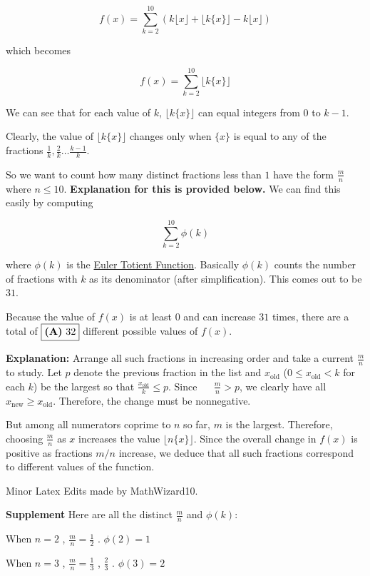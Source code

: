 \begin{enumerate}
 
 \[f(x) = \sum_{k=2}^{10} ( k \lfloor x \rfloor + \lfloor k \{ x \} \rfloor - k \lfloor x \rfloor)\]

 which becomes

 
 \[f(x) = \sum_{k=2}^{10} \lfloor k \{ x \} \rfloor\]

 We can see that for each value of $k$, $\lfloor k \{ x \} \rfloor$ can equal integers from $0$ to $k-1$. 

 Clearly, the value of $\lfloor k \{ x \} \rfloor$ changes only when $\{ x \}$ is equal to any of the fractions $\frac{1}{k}, \frac{2}{k} \dots \frac{k-1}{k}$.

 So we want to count how many distinct fractions less than $1$ have the form $\frac{m}{n}$ where $n \le 10$. \textbf{Explanation for this is provided below.} We can find this easily by computing

 
 \[\sum_{k=2}^{10} \phi(k)\]

 where $\phi(k)$ is the \href{https://artofproblemsolving.com/wiki/index.php?title=Euler\_Totient\_Function}{Euler Totient Function}. Basically $\phi(k)$ counts the number of fractions with $k$ as its denominator (after simplification). This comes out to be $31$.

 Because the value of $f(x)$ is at least $0$ and can increase $31$ times, there are a total of $\fbox{\textbf{(A)}\ 32}$ different possible values of $f(x)$.

 \textbf{Explanation:} Arrange all such fractions in increasing order and take a current $\frac{m}{n}$ to study. Let $p$ denote the previous fraction in the list and $x_\text{old}$ ($0 \le x_\text{old} < k$ for each $k$) be the largest so that $\frac{x_\text{old}}{k} \le p$. Since  $\text{ }\text{ }\frac{m}{n} > p$, we clearly have all $x_\text{new} \ge x_\text{old}$. Therefore, the change must be nonnegative.

 But among all numerators coprime to $n$ so far, $m$ is the largest. Therefore, choosing $\frac{m}{n}$ as ${x}$ increases the value $\lfloor n \{ x \} \rfloor$. Since the overall change in $f(x)$ is positive as fractions $m/n$ increase, we deduce that all such fractions correspond to different values of the function. 

 Minor Latex Edits made by MathWizard10.

 \textbf{Supplement} Here are all the distinct $\frac{m}{n}$ and $\phi(k):$

 When $n=2$ , $\frac{m}{n}=\frac{1}{2}$ . $\phi(2)=1$

 When $n=3$ , $\frac{m}{n}=\frac{1}{3}$ , $\frac{2}{3}$ . $\phi(3)=2$


\end{enumerate}

